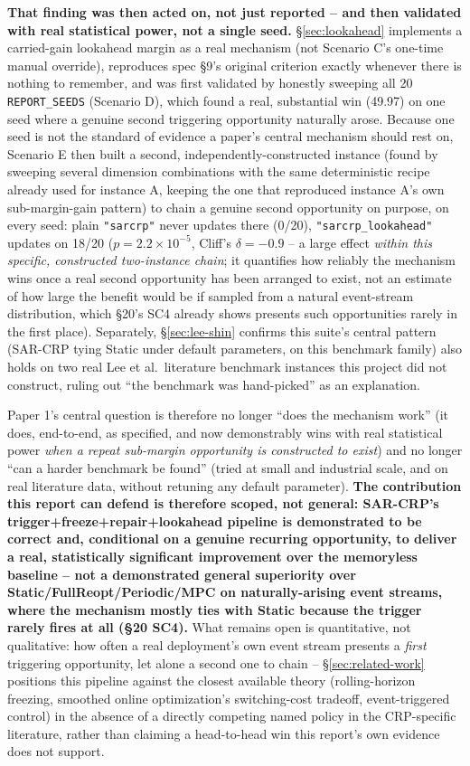 \documentclass[11pt]{article}
\begin{document}
\textbf{That finding was then acted on, not just reported -- and then
validated with real statistical power, not a single seed.}
\S\ref{sec:lookahead} implements a carried-gain lookahead margin as a
real mechanism (not Scenario C's one-time manual override), reproduces
spec \S9's original criterion exactly whenever there is nothing to
remember, and was first validated by honestly sweeping all 20
\texttt{REPORT\_SEEDS} (Scenario D), which found a real, substantial win
(49.97) on one seed where a genuine second triggering opportunity
naturally arose. Because one seed is not the standard of evidence a
paper's central mechanism should rest on, Scenario E then built a second,
independently-constructed instance (found by sweeping several dimension
combinations with the same deterministic recipe already used for
instance A, keeping the one that reproduced instance A's own
sub-margin-gain pattern) to chain a genuine second opportunity on
purpose, on every seed: plain \texttt{"sarcrp"} never updates there
(0/20), \texttt{"sarcrp\_lookahead"} updates on 18/20
($p=2.2\times10^{-5}$, Cliff's $\delta=-0.9$ -- a large effect \emph{within
this specific, constructed two-instance chain}; it quantifies how
reliably the mechanism wins once a real second opportunity has been
arranged to exist, not an estimate of how large the benefit would be if
sampled from a natural event-stream distribution, which \S20's SC4 already
shows presents such opportunities rarely in the first place). Separately,
\S\ref{sec:lee-shin} confirms this suite's central pattern (SAR-CRP tying
Static under default parameters, on this benchmark family) also holds on
two real Lee et al.\ literature benchmark instances this project did not
construct, ruling out ``the benchmark was hand-picked'' as an
explanation.

Paper 1's central question is therefore no longer ``does the mechanism
work'' (it does, end-to-end, as specified, and now demonstrably wins with
real statistical power \emph{when a repeat sub-margin opportunity is
constructed to exist}) and no longer ``can a harder benchmark be found''
(tried at small and industrial scale, and on real literature data,
without retuning any default parameter). \textbf{The contribution this
report can defend is therefore scoped, not general: SAR-CRP's
trigger+freeze+repair+lookahead pipeline is demonstrated to be correct
and, conditional on a genuine recurring opportunity, to deliver a real,
statistically significant improvement over the memoryless baseline -- not
a demonstrated general superiority over Static/FullReopt/Periodic/MPC on
naturally-arising event streams, where the mechanism mostly ties with
Static because the trigger rarely fires at all (\S20 SC4).} What remains
open is quantitative, not qualitative: how often a real deployment's own
event stream presents a \emph{first} triggering opportunity, let alone a
second one to chain -- \S\ref{sec:related-work} positions this pipeline
against the closest available theory (rolling-horizon freezing, smoothed
online optimization's switching-cost tradeoff, event-triggered control)
in the absence of a directly competing named policy in the CRP-specific
literature, rather than claiming a head-to-head win this report's own
evidence does not support.
\end{document}
